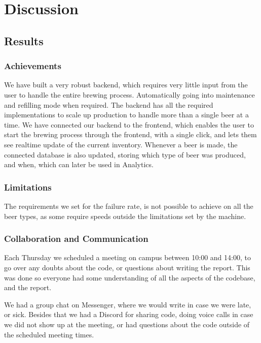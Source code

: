 \section{Discussion}

\subsection{Results}
\subsubsection{Achievements}
We have built a very robust backend, which requires very little input from the user to handle the entire brewing process. 
Automatically going into maintenance and refilling mode when required.
The backend has all the required implementations to scale up production to handle more than a single beer at a time.
We have connected our backend to the frontend, which enables the user to start the brewing process through the frontend, 
with a single click, and lets them see realtime update of the current inventory.
Whenever a beer is made, the connected database is also updated, storing which type of beer was produced, and when, which can later be used in Analytics.

\subsubsection{Limitations}
The requirements we set for the failure rate,
is not possible to achieve on all the beer types,
as some require speeds outside the limitations set by the machine.

\subsubsection{Collaboration and Communication}
Each Thursday we scheduled a meeting on campus between 10:00 and 14:00,
to go over any doubts about the code, or questions about writing the report.
This was done so everyone had some understanding of all the aspects 
of the codebase, and the report.


We had a group chat on Messenger, where we would write in case we were late,
or sick.
Besides that we had a Discord for sharing code, doing voice calls in case 
we did not show up at the meeting, or had questions about the code 
outside of the scheduled meeting times.

